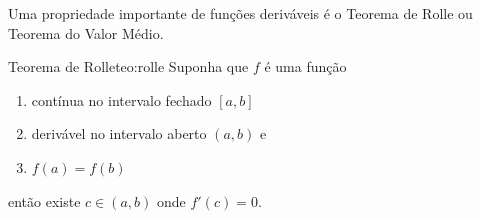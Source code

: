 Uma propriedade importante de funções deriváveis é o Teorema de Rolle ou
Teorema do Valor Médio.

\begin{teorema}{Teorema de Rolle}{teo:rolle}
  Suponha
  que $f$ é uma função
  \begin{enumerate}
    \item contínua  no intervalo fechado $[a, b]$
    \item derivável no intervalo aberto  $(a, b)$ e
    \item \(f(a)=f(b)\)
  \end{enumerate}
  então existe $c\in(a, b)$ onde $f'(c)=0$.
\end{teorema}

